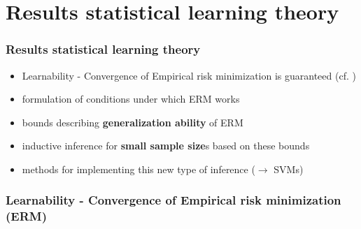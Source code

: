 \section{Results statistical learning theory}

\begin{frame}\frametitle{Results statistical learning theory}
		\begin{itemize}
			\item Learnability - Convergence of Empirical risk minimization is guaranteed (cf. )
			\item formulation of conditions under which ERM works
			\item bounds describing \textbf{generalization ability} of ERM 
			\item inductive inference for \textbf{small sample size}s 
				based on these bounds
			\item methods for implementing this new type 
				of inference ($\rightarrow$ {SVMs})
		\end{itemize}
\end{frame}

\subsubsection{Learnability - Convergence of Empirical risk minimization (ERM)}

